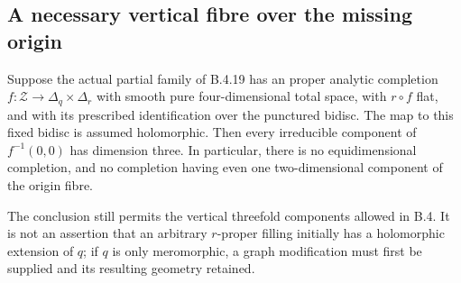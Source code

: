 \subsection{A necessary vertical fibre over the missing origin}

\begin{proposition}
\label{push:B426}
Suppose the actual partial family of B.4.19 has an
proper analytic completion $f:\mathcal Z\to\Delta_q\times\Delta_r$
with smooth pure four-dimensional total space, with
$r\circ f$ flat, and with its prescribed identification
over the punctured bidisc. The map to this fixed bidisc
is assumed holomorphic. Then every irreducible component
of $f^{-1}(0,0)$ has dimension three. In particular,
there is no equidimensional completion, and no completion
having even one two-dimensional component of the origin
fibre.

The conclusion still permits the vertical threefold
components allowed in B.4. It is not an assertion that
an arbitrary $r$-proper filling initially has a holomorphic
extension of $q$; if $q$ is only meromorphic, a graph
modification must first be supplied and its resulting
geometry retained.
\end{proposition}

